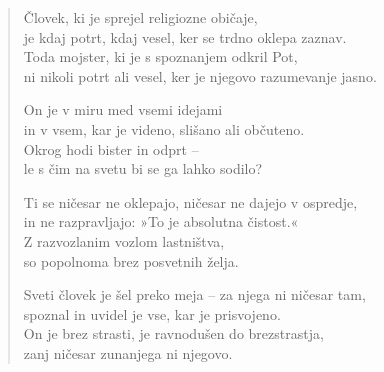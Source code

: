 
\clearpage
\begin{verse}

Človek, ki je sprejel religiozne običaje,\\
je kdaj potrt, kdaj vesel, ker se trdno oklepa zaznav.\\
Toda mojster, ki je s spoznanjem odkril Pot,\\
ni nikoli potrt ali vesel, ker je njegovo razumevanje jasno.

On je v miru med vsemi idejami\\
in v vsem, kar je videno, slišano ali občuteno.\\
Okrog hodi bister in odprt --\\
le s čim na svetu bi se ga lahko sodilo?

Ti se ničesar ne oklepajo, ničesar ne dajejo v ospredje,\\
in ne razpravljajo: »To je absolutna čistost.«\\
Z razvozlanim vozlom lastništva,\\
so popolnoma brez posvetnih želja.

Sveti človek je šel preko meja -- za njega ni ničesar tam,\\
spoznal in uvidel je vse, kar je prisvojeno.\\
On je brez strasti, je ravnodušen do brezstrastja,\\
zanj ničesar zunanjega ni njegovo.

\end{verse}

